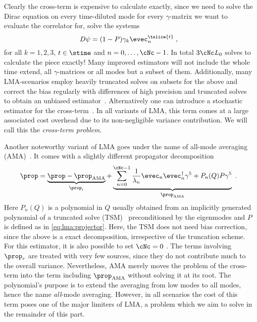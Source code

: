 Clearly the cross-term is expensive to calculate exactly, since we need to solve the Dirac equation on every time-diluted mode for every $\gamma$-matrix we want to evaluate the correlator for, \ie solve the systems
\begin{equation}
D \psi = (1-P) \gamma_k \evec_{n}^{\tslice{t}} \;,
\end{equation}
for all $k = 1,2,3$, $t \in \stime$ and $n = 0, \ldots, \cNc-1$.
In total $3 \cNc L_0$ solves to calculate the piece exactly!
Many improved estimators will not include the whole time extend, all $\gamma$-matrices or all modes but a subset of them.
Additionally, many LMA-scenarios employ heavily truncated solves on subsets for the above and correct the bias regularly with differences of high precision and truncated solves to obtain an unbiased estimator~\cite{bmw_2017,Kuberski_2023}.
Alternatively one can introduce a stochastic estimator for the cross-term~\cite{lynch2023,fermi_2023}.
In all variants of LMA, this term comes at a large associated cost overhead due to its non-negligible variance contribution.
We will call this the \emph{cross-term problem}.

Another noteworthy variant of LMA goes under the name of all-mode averaging (AMA)~\cite{Blum_2012,CAA,Blum_2015,RBC_2018}.
It comes with a slightly different propagator decomposition
\begin{equation}
\prop
= \underbrace{\prop - \prop_{\text{AMA}}}_{\prop_{\text{r}}}
+ \underbrace{\sum_{n=0}^{\cNc-1} \frac{1}{\lambda_n} \evec_n \evec_n^{\dagger} \gamma^{5}
+ P_n(Q) P \gamma^{5}}_{\prop_{\text{AMA}}} \;.
\end{equation}
Here $P_n(Q)$ is a polynomial in $Q$ usually obtained from an implicitly generated polynomial of a truncated solve (TSM)~\cite{Bali_2009} preconditioned by the eigenmodes and $P$ is defined as in \cref{eq:lma:projector}.
Here, the TSM does not need bias correction, since the above is a exact decomposition, irrespective of the truncation scheme.
For this estimator, it is also possible to set $\cNc=0$ \cite{Blum_2012}.
The terms involving $\prop_{r}$ are treated with very few sources, since they do not contribute much to the overall variance.
Nevertheless, AMA merely moves the problem of the cross-term into the term including $\prop_{\text{AMA}}$ without solving it at its root.
The polynomial's purpose is to extend the averaging from low modes to all modes, hence the name \emph{all}-mode averaging.
However, in all scenarios the cost of this term poses one of the major limiters of LMA, a problem which we aim to solve in the remainder of this part.

